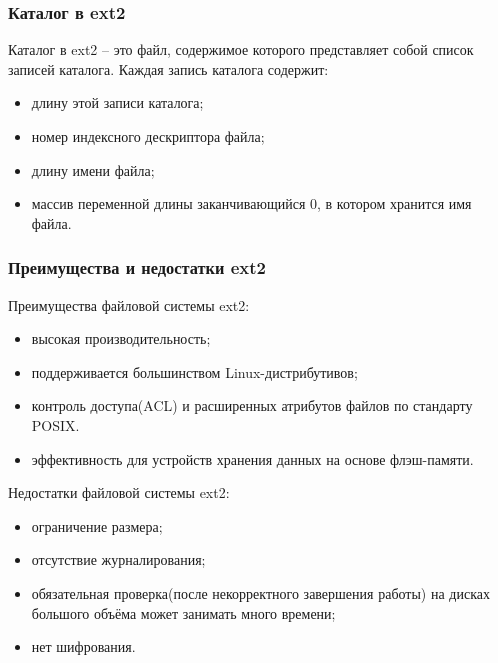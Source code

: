 \subsubsection{Каталог в ext2}

Каталог в ext2 -- это файл, содержимое которого представляет собой список записей каталога.
Каждая запись каталога содержит:
\begin{itemize}
\item длину этой записи каталога;
\item номер индексного дескриптора файла;
\item длину имени файла;
\item массив переменной длины заканчивающийся 0, в котором хранится имя файла.
\end{itemize}

\subsubsection{Преимущества и недостатки ext2}

Преимущества файловой системы ext2:

\begin{itemize}
\item высокая производительность;
\item поддерживается большинством Linux-дистрибутивов;
\item контроль доступа(ACL) и расширенных атрибутов файлов по стандарту POSIX.
\item эффективность для устройств хранения данных на основе флэш-памяти.
\end{itemize}

Недостатки файловой системы ext2:

\begin{itemize}
\item ограничение размера;
\item отсутствие журналирования;
\item обязательная проверка(после некорректного завершения работы) на дисках большого объёма может занимать много времени;
\item нет шифрования.
\end{itemize}